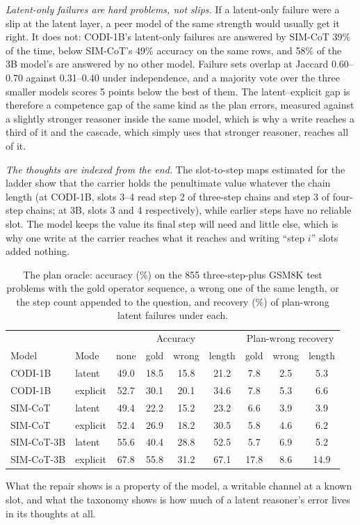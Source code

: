 \documentclass{article}
\begin{document}
\emph{Latent-only failures are hard problems, not slips.} If a latent-only failure were a slip at the latent layer, a peer model of the same strength would usually get it right. It does not: CODI-1B's latent-only failures are answered by SIM-CoT 39\% of the time, below SIM-CoT's 49\% accuracy on the same rows, and 58\% of the 3B model's are answered by no other model. Failure sets overlap at Jaccard 0.60--0.70 against 0.31--0.40 under independence, and a majority vote over the three smaller models scores 5 points below the best of them. The latent--explicit gap is therefore a competence gap of the same kind as the plan errors, measured against a slightly stronger reasoner inside the same model, which is why a write reaches a third of it and the cascade, which simply uses that stronger reasoner, reaches all of it.

\emph{The thoughts are indexed from the end.} The slot-to-step maps estimated for the ladder show that the carrier holds the penultimate value whatever the chain length (at CODI-1B, slots 3--4 read step 2 of three-step chains and step 3 of four-step chains; at 3B, slots 3 and 4 respectively), while earlier steps have no reliable slot. The model keeps the value its final step will need and little else, which is why one write at the carrier reaches what it reaches and writing ``step $i$'' slots added nothing.

\begin{table}[h]
\caption{The plan oracle: accuracy (\%) on the 855 three-step-plus GSM8K test problems with the gold operator sequence, a wrong one of the same length, or the step count appended to the question, and recovery (\%) of plan-wrong latent failures under each.}
\label{tab:oracle}
\centering
\scriptsize
\setlength{\tabcolsep}{3pt}
\begin{tabular}{llcccc|ccc}
\toprule
 & & \multicolumn{4}{c|}{Accuracy} & \multicolumn{3}{c}{Plan-wrong recovery} \\
Model & Mode & none & gold & wrong & length & gold & wrong & length \\
\midrule
CODI-1B & latent & 49.0 & 18.5 & 15.8 & 21.2 & 7.8 & 2.5 & 5.3 \\
CODI-1B & explicit & 52.7 & 30.1 & 20.1 & 34.6 & 7.8 & 5.3 & 6.6 \\
SIM-CoT & latent & 49.4 & 22.2 & 15.2 & 23.2 & 6.6 & 3.9 & 3.9 \\
SIM-CoT & explicit & 52.4 & 26.9 & 18.2 & 30.5 & 5.8 & 4.6 & 6.2 \\
SIM-CoT-3B & latent & 55.6 & 40.4 & 28.8 & 52.5 & 5.7 & 6.9 & 5.2 \\
SIM-CoT-3B & explicit & 67.8 & 55.8 & 31.2 & 67.1 & 17.8 & 8.6 & 14.9 \\
\bottomrule
\end{tabular}
\end{table} What the repair shows is a property of the model, a writable channel at a known slot, and what the taxonomy shows is how much of a latent reasoner's error lives in its thoughts at all.
\end{document}
